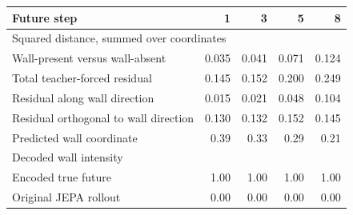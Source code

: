 \begin{tabular}{lrrrr}
\toprule
\rowcolor{Navy!8}
Future step & 1 & 3 & 5 & 8 \\
\midrule
\multicolumn{5}{l}{Squared distance, summed over coordinates} \\
Wall-present versus wall-absent & 0.035 & 0.041 & 0.071 & 0.124 \\
Total teacher-forced residual & 0.145 & 0.152 & 0.200 & 0.249 \\
Residual along wall direction & 0.015 & 0.021 & 0.048 & 0.104 \\
Residual orthogonal to wall direction & 0.130 & 0.132 & 0.152 & 0.145 \\
\midrule
Predicted wall coordinate & 0.39 & 0.33 & 0.29 & 0.21 \\
\midrule
\multicolumn{5}{l}{Decoded wall intensity} \\
Encoded true future & 1.00 & 1.00 & 1.00 & 1.00 \\
Original JEPA rollout & 0.00 & 0.00 & 0.00 & 0.00 \\
\bottomrule
\end{tabular}
